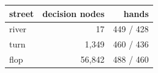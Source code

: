 \begin{tabular}{lrr}
\toprule
street & decision nodes & hands \\ \midrule
river & 17 & 449 / 428 \\
turn & 1,349 & 460 / 436 \\
flop & 56,842 & 488 / 460 \\
\bottomrule
\end{tabular}
